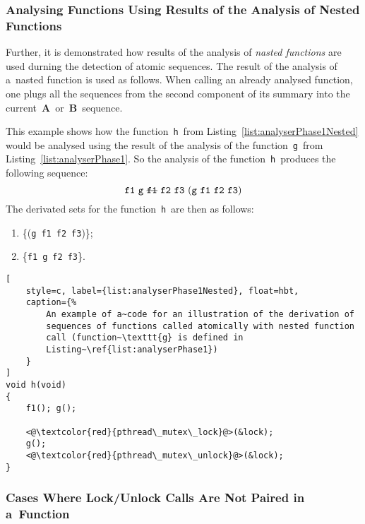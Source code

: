 \subsubsection{%
    Analysing Functions Using Results of the Analysis of Nested Functions
}

Further, it is demonstrated how results of the analysis of \emph{nasted
functions} are used durning the detection of atomic sequences. The
result of the analysis of a~nasted function is used as follows. When
calling an already analysed function, one plugs all the sequences from the
second component of its summary into the 
current~\textbf{A}~or~\textbf{B}~sequence.

\begin{example}
    This example shows how the function~\texttt{h}~from
    Listing~\ref{list:analyserPhase1Nested} would be analysed using the 
    result of the analysis of the function~\texttt{g}~from 
    Listing~\ref{list:analyserPhase1}. So the analysis of the 
    function~\texttt{h}~produces the following sequence:
    $$
        \text{%
            \texttt{f1}~\texttt{g}~\sout{\texttt{f1}}~\texttt{f2}~\texttt{f3}
        }
        (\text{%
            \texttt{g}~\texttt{f1}~\texttt{f2}~\texttt{f3}%
        })
    $$
    The derivated sets for the function~\texttt{h}~are then as follows:
    \begin{enumerate}[label={(\roman*)}]
        \item
            \{(\texttt{g}~\texttt{f1}~\texttt{f2}~\texttt{f3})\};
    
        \item
            \{\texttt{f1}~\texttt{g}~\texttt{f2}~\texttt{f3}\}.
    \end{enumerate}
\end{example}

\begin{lstlisting}[
    style=c, label={list:analyserPhase1Nested}, float=hbt,
    caption={%
        An example of a~code for an illustration of the derivation of
        sequences of functions called atomically with nested function
        call (function~\texttt{g} is defined in
        Listing~\ref{list:analyserPhase1})
    }
]
void h(void)
{
    f1(); g();

    <@\textcolor{red}{pthread\_mutex\_lock}@>(&lock);
    g();
    <@\textcolor{red}{pthread\_mutex\_unlock}@>(&lock);
}
\end{lstlisting}

\subsubsection{Cases Where Lock/Unlock Calls Are Not Paired in a~Function}

